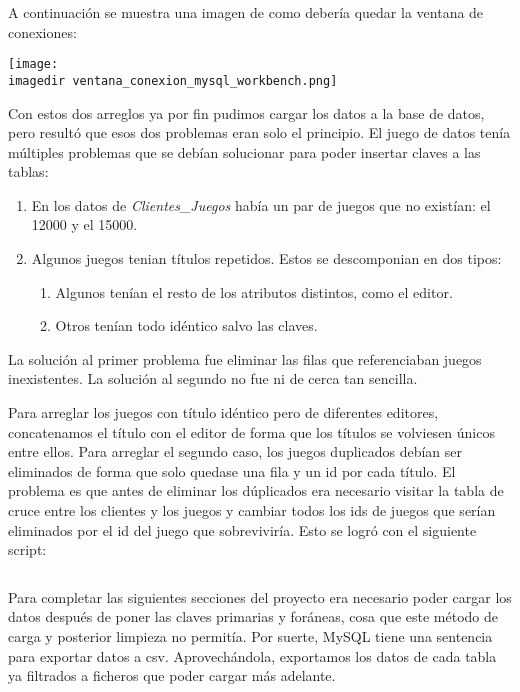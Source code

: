 \documentclass[a4paper, 11pt, oneside]{article} %
\newcommand{\scriptdir}{../scripts/} %
\newcommand{\imagedir}{../images/} %
\begin{document}
A continuación se muestra una imagen de como debería quedar la ventana de conexiones:

\texttt{[image: \\imagedir ventana\_conexion\_mysql\_workbench.png]}

Con estos dos arreglos ya por fin pudimos cargar los datos a la base de datos, pero resultó que esos dos problemas eran solo el principio. El juego de datos tenía múltiples problemas que se debían solucionar para poder insertar claves a las tablas:

\begin{enumerate}
	\item En los datos de \emph{Clientes\_Juegos} había un par de juegos que no existían: el 12000 y el 15000.

	\item Algunos juegos tenian títulos repetidos. Estos se descomponian en dos tipos:
	\begin{enumerate}
		\item Algunos tenían el resto de los atributos distintos, como el editor.
		\item Otros tenían todo idéntico salvo las claves.
	\end{enumerate}
\end{enumerate}

La solución al primer problema fue eliminar las filas que referenciaban juegos inexistentes. La solución al segundo no fue ni de cerca tan sencilla.

Para arreglar los juegos con título idéntico pero de diferentes editores, concatenamos el título con el editor de forma que los títulos se volviesen únicos entre ellos. Para arreglar el segundo caso, los juegos duplicados debían ser eliminados de forma que solo quedase una fila y un id por cada título. El problema es que antes de eliminar los dúplicados era necesario visitar la tabla de cruce entre los clientes y los juegos y cambiar todos los ids de juegos que serían eliminados por el id del juego que sobreviviría. Esto se logró con el siguiente script:

\inputminted{mysql}{\scriptdir limpieza_datos.sql}

Para completar las siguientes secciones del proyecto era necesario poder cargar los datos después de poner las claves primarias y foráneas, cosa que este método de carga y posterior limpieza no permitía. Por suerte, MySQL tiene una sentencia para exportar datos a csv. Aprovechándola, exportamos los datos de cada tabla ya filtrados a ficheros que poder cargar más adelante.
\end{document}
